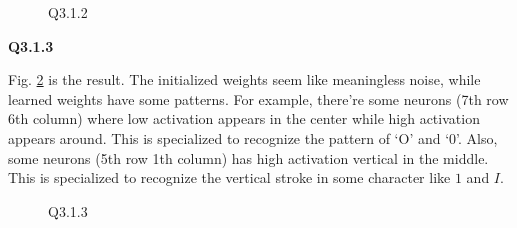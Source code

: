 \documentclass[
  course = {{16-720B Computer Vision}},
  quartile = {{1}},
  assignment = 3-Neural\ Networks\ for\ Recognition,
  name = {{Kangle Deng}},
  email = {{kangled@andrew.cmu.edu}},
  firstexercise = 1
]{aga-homework}
\begin{document}
\begin{figure}
    \caption{Q3.1.2}
    \label{fig:cv_hw3_q312}
\end{figure}

\noindent\textbf{Q3.1.3}

Fig. \ref{fig:cv_hw3_q313} is the result. The initialized weights seem like meaningless noise, while learned weights have some patterns. For example, there're some neurons (7th row 6th column) where low activation appears in the center while high activation appears around. This is specialized to recognize the pattern of `O' and `0'. Also, some neurons (5th row 1th column) has high activation vertical in the middle. This is specialized to recognize the vertical stroke in some character like $1$ and $I$.

\begin{figure}
    \centering
    \caption{Q3.1.3}
    \label{fig:cv_hw3_q313}
\end{figure}
\end{document}
